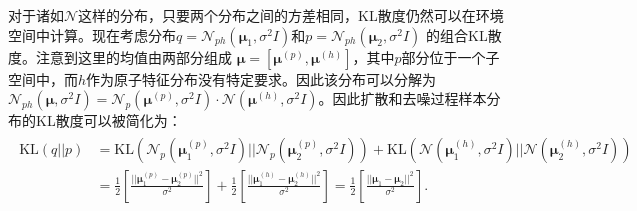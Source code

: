 对于诸如$\mathcal{N}$这样的分布，只要两个分布之间的方差相同，KL散度仍然可以在环境空间中计算。现在考虑分布$q = \mathcal{N}_{ph}(\mathbf{\mu}_1, \sigma^2 I)$和$p = \mathcal{N}_{ph}(\mathbf{\mu}_2, \sigma^2 I)$ 的组合KL散度。注意到这里的均值由两部分组成 $\mathbf{\mu} = [\mathbf{\mu}^{(p)}, \mathbf{\mu}^{(h)}]$，其中$p$部分位于一个子空间中，而$h$作为原子特征分布没有特定要求。因此该分布可以分解为$\mathcal{N}_{ph}(\mathbf{\mu}, \sigma^2 I) = \mathcal{N}_{p}(\mathbf{\mu}^{(p)}, \sigma^2 I) \cdot \mathcal{N}(\mathbf{\mu}^{(h)}, \sigma^2 I)$。因此扩散和去噪过程样本分布的KL散度可以被简化为：
\begin{align}
    \begin{split}
        \mathrm{KL}(q||p) &= \mathrm{KL}\left(\mathcal{N}_{p}(\mathbf{\mu}_1^{(p)}, \sigma^2 I) || \mathcal{N}_{p}(\mathbf{\mu}_2^{(p)}, \sigma^2 I)\right) + \mathrm{KL}\left(\mathcal{N}(\mathbf{\mu}_1^{(h)}, \sigma^2 I) || \mathcal{N}(\mathbf{\mu}_2^{(h)}, \sigma^2 I )\right) \\
        &= \frac{1}{2} \left[ \frac{||\mathbf{\mu}_1^{(p)} - \mathbf{\mu}_2^{(p)}||^2}{\sigma^2} \right] + \frac{1}{2} \left[ \frac{||\mathbf{\mu}_1^{(h)} - \mathbf{\mu}_2^{(h)}||^2}{\sigma^2} \right] = \frac{1}{2} \left[ \frac{||\mathbf{\mu}_1 - \mathbf{\mu}_2||^2}{\sigma^2} \right].
    \end{split}
\end{align}
